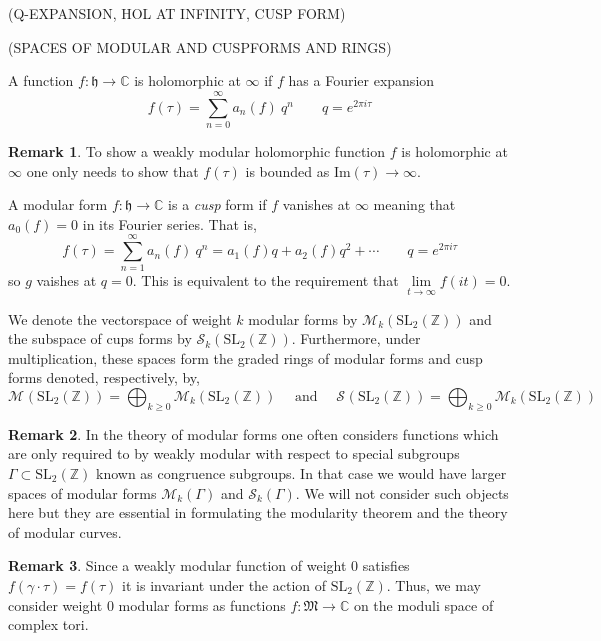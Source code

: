 \documentclass{article}
\newcommand{\SL}[0]{\mathrm{SL}}
\newcommand{\Z}{\mathbb{Z}}
\newcommand{\C}{\mathbb{C}}
\newcommand{\Imt}[0]{\mathrm{Im}}
\theoremstyle{definition}
\newtheorem{remark}{Remark}[section]
\newenvironment{definition}[1][Definition:]{\begin{trivlist}
\item[\hskip \labelsep {\bfseries #1}]}{\end{trivlist}}
\renewcommand{\S}[1]{\mathcal{S}_{#1}}
\newcommand{\M}[1]{\mathcal{M}_{#1}}
\newcommand{\h}{\mathfrak{h}}
\newcommand{\MG}{\SL_2(\Z)}
\begin{document}
(Q-EXPANSION, HOL AT INFINITY, CUSP FORM)

(SPACES OF MODULAR AND CUSPFORMS AND RINGS)

\begin{definition}
A function $f: \h \to \C$ is holomorphic at $\infty$ if $f$ has a Fourier expansion 
\[ f(\tau) = \sum_{n = 0}^{\infty} a_n(f) \: q^n \quad \quad  q = e^{2\pi i \tau} \]
\end{definition}


\begin{remark}
To show a weakly modular holomorphic function $f$ is holomorphic at $\infty$ one only needs to show that $f(\tau)$ is bounded as $\Imt(\tau) \to \infty$.
\end{remark}

\begin{definition}
A modular form $f : \h \to \C$ is a \textit{cusp} form if $f$ vanishes at $\infty$ meaning that $a_0(f) = 0$ in its Fourier series. That is,
\[ f(\tau) = \sum^\infty_{n = 1} a_n(f) \: q^n = a_1(f) q + a_2(f) q^2 + \cdots \quad \quad q = e^{2 \pi i \tau} \]
so $g$ vaishes at $q = 0$. This is equivalent to the requirement that $\lim\limits_{t \to \infty} f(i t) = 0$. 
\end{definition}


\begin{definition}
We denote the vectorspace of weight $k$ modular forms by $\M{k}(\MG)$ and the subspace of cups forms by $\S{k}(\MG)$. Furthermore, under multiplication, these spaces form the graded rings of modular forms and cusp forms denoted, respectively, by,
\[ \M{}(\MG) = \bigoplus_{k \ge 0} \M{k}(\MG) \quad \text{ and } \quad \S{}(\MG) = \bigoplus_{k \ge 0} \M{k}(\MG) \]
\end{definition}

\begin{remark}
In the theory of modular forms one often considers functions which are only required to by weakly modular with respect to special subgroups $\Gamma \subset \MG$ known as congruence subgroups. In that case we would have larger spaces of modular forms $\M{k}(\Gamma)$ and $\S{k}(\Gamma)$. We will not consider such objects here but they are essential in formulating the modularity theorem and the theory of modular curves. 
\end{remark}

\begin{remark}
Since a weakly modular function of weight $0$ satisfies $f(\gamma \cdot \tau) = f(\tau)$ it is invariant under the action of $\MG$. Thus, we may consider weight $0$ modular forms as functions $f : \mathfrak{M} \to \C$ on the moduli space of complex tori. 
\end{remark}
\end{document}
